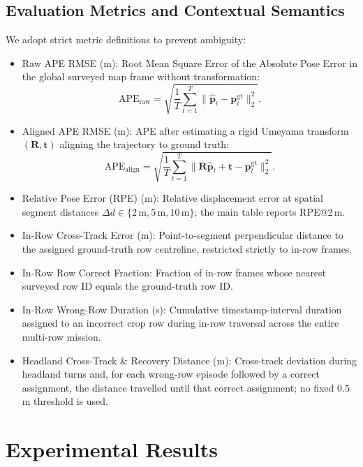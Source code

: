 \documentclass[letterpaper, 10 pt, conference]{ieeeconf}
\begin{document}
\subsection{Evaluation Metrics and Contextual Semantics}
We adopt strict metric definitions to prevent ambiguity:
\begin{itemize}
  \item Raw APE RMSE (m): Root Mean Square Error of the Absolute Pose Error in the global surveyed map frame without transformation:
  \begin{equation}
  \text{APE}_{\text{raw}} = \sqrt{\frac{1}{T} \sum_{t=1}^T \|\hat{\mathbf{p}}_t - \mathbf{p}_t^{\text{gt}}\|_2^2}.
  \end{equation}
  \item Aligned APE RMSE (m): APE after estimating a rigid Umeyama transform $(\mathbf{R}, \mathbf{t})$ aligning the trajectory to ground truth:
  \begin{equation}
  \text{APE}_{\text{align}} = \sqrt{\frac{1}{T} \sum_{t=1}^T \|\mathbf{R}\hat{\mathbf{p}}_t + \mathbf{t} - \mathbf{p}_t^{\text{gt}}\|_2^2}.
  \end{equation}
  \item Relative Pose Error (RPE) (m): Relative displacement error at spatial segment distances $\Delta d \in \{2\,\text{m}, 5\,\text{m}, 10\,\text{m}\}$; the main table reports RPE@2\,m.
  \item In-Row Cross-Track Error (m): Point-to-segment perpendicular distance to the assigned ground-truth row centreline, restricted strictly to in-row frames.
  \item In-Row Row Correct Fraction: Fraction of in-row frames whose nearest surveyed row ID equals the ground-truth row ID.
  \item In-Row Wrong-Row Duration (s): Cumulative timestamp-interval duration assigned to an incorrect crop row during in-row traversal across the entire multi-row mission.
  \item Headland Cross-Track \& Recovery Distance (m): Cross-track deviation during headland turns and, for each wrong-row episode followed by a correct assignment, the distance travelled until that correct assignment; no fixed $0.5\,$m threshold is used.
\end{itemize}

\section{Experimental Results}
\label{sec:results}
\end{document}
